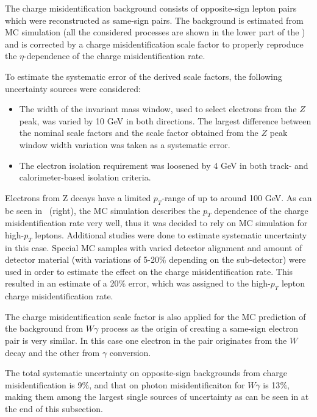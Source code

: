 The charge misidentification background consists of opposite-sign lepton pairs which were reconstructed as same-sign pairs.
The background is estimated from MC simulation (all the considered processes are shown in the lower part of the ) 
and is corrected by a charge misidentification scale factor to properly reproduce the $\eta$-dependence of the charge misidentification rate.

To estimate the systematic error of the derived scale factors, the following uncertainty sources were considered:
\begin{itemize}
 \item The width of the invariant mass window, used to select electrons from the $Z$ peak, was varied by 10 GeV in both directions.
 The largest difference between the nominal scale factors and the scale factor obtained from the $Z$ peak window width variation was taken as a systematic error.
 \item The electron isolation requirement was loosened by 4 GeV in both track- and calorimeter-based isolation criteria.
\end{itemize}
Electrons from Z decays have a limited $p_T$-range of up to around 100 GeV. As can be seen in~ (right), 
the MC simulation describes the $p_T$ dependence of the charge misidentification rate very well, thus it was decided to rely on MC simulation 
for high-$p_T$ leptons. Additional studies were done to estimate systematic uncertainty in this case.
Special MC samples with varied detector alignment and amount of detector material (with variations of 5-20$\%$ depending on the sub-detector) 
were used in order to estimate the effect on the charge misidentification rate.
This resulted in an estimate of a 20$\%$ error, which was assigned to the high-$p_T$ lepton charge misidentification rate.

The charge misidentification scale factor is also applied for the MC prediction of the background from $W\gamma$ process
as the origin of creating a same-sign electron pair is very similar.
In this case one electron in the pair originates from the $W$ decay and the other from $\gamma$ conversion.

The total systematic uncertainty on opposite-sign backgrounds from charge misidentification is 9$\%$, and that on photon misidentificaiton for $W\gamma$ is 13$\%$, making them among the largest single sources of uncertainty as can be seen in  at the end of this subsection.

